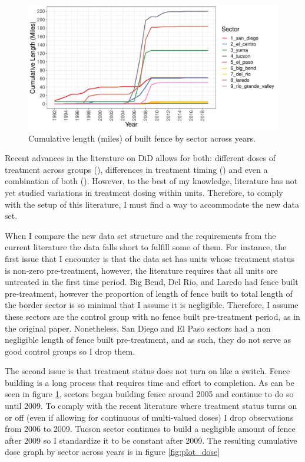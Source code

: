 \documentclass[titlepage]{article}
\theoremstyle{plain}
\theoremstyle{plain}
\begin{document}
\begin{figure}[H]
	\centering
	\caption{Cumulative length (miles) of built fence by sector across years.} 
	\label{fig:plot_cum_length} 
	\includegraphics[width=\textwidth]{_images/plot_cum_length.pdf}
\end{figure}

Recent advances in the literature on DiD allows for both: different doses of treatment across groups (\cite{callaway2021differenceindifferences, chaisemartin2022}), differences in treatment timing (\cite{Callaway2021, GOODMANBACON2021254}) and even a combination of both (\cite{callaway2021differenceindifferences}). However, to the best of my knowledge, literature has not yet studied variations in treatment dosing within units. Therefore, to comply with the setup of this literature, I must find a way to accommodate the new data set.

When I compare the new data set structure and the requirements from the current literature the data falls short to fulfill some of them. For instance, the first issue that I encounter is that the data set has units whose treatment status is non-zero pre-treatment, however, the literature requires that all units are untreated in the first time period. Big Bend, Del Rio, and Laredo had fence built pre-treatment, however the proportion of length of fence built to total length of the border sector is so minimal that I assume it is negligible. Therefore, I assume these sectors are the control group with no fence built pre-treatment period, as in the original paper. Nonetheless, San Diego and El Paso sectors had a non negligible length of fence built pre-treatment, and as such, they do not serve as good control groups so I drop them.

The second issue is that treatment status does not turn on like a switch. Fence building is a long process that requires time and effort to completion. As can be seen in figure \ref{fig:plot_cum_length}, sectors began building fence around 2005 and continue to do so until 2009. To comply with the recent literature where treatment status turns on or off (even if allowing for continuous of multi-valued doses) I drop observations from 2006 to 2009. Tucson sector continues to build a negligible amount of fence after 2009 so I standardize it to be constant after 2009. The resulting cumulative dose graph by sector across years is in figure \ref{fig:plot_dose}
\end{document}
